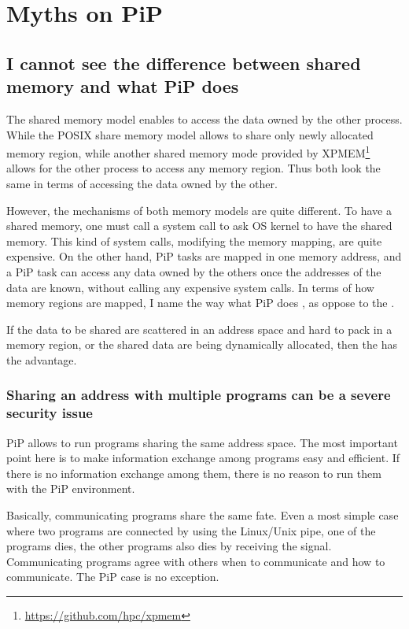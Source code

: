 
\section{Myths on PiP}

\subsection*{I cannot see the difference between shared memory and
  what PiP does}

The shared memory model enables to access the data owned by the other
process. While the POSIX share memory model allows to share only newly
allocated memory region, while another shared memory mode provided by 
XPMEM\footnote{\url{https://github.com/hpc/xpmem}} allows for the
other process to access any memory region. Thus both look
the same in terms of accessing the data owned by the other.

However, the mechanisms of both memory models are quite different. To
have a shared memory, one must call a system call to ask OS kernel to
have the shared memory. This kind of system calls, modifying the
memory mapping, are quite expensive. On the other hand, PiP tasks are 
mapped in one memory address, and a PiP task can access any data owned
by the others once the addresses of the data are known, without calling
any expensive system calls. In terms of how memory regions are mapped,
I name the way what PiP does , as
oppose to the . 

If the data to be shared are scattered in an address space and hard to
pack in a memory region, or the shared data are being dynamically
allocated, then the  has the
advantage.  

\subsubsection*{Sharing an address with multiple programs can be a
  severe security issue}\label{sec:security-issue}

PiP allows to run programs sharing the same address space. The
most important point here is to make information exchange among
programs easy and efficient. If there is no information exchange among
them, there is no reason to run them with the PiP environment.

Basically, communicating programs share the same fate. Even a most
simple case where two programs are connected by using the Linux/Unix
pipe, one of the programs dies, the other programs also dies by
receiving the  signal. Communicating programs agree with
others when to communicate and how to communicate. The PiP case is no
exception.

